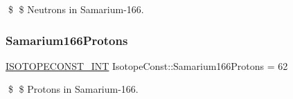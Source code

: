 \$ \$ Neutrons in Samarium-\/166. \mbox{\label{group___isotope_const-_samarium-_sm166_gab59256aba152d87b7b8c732ebb6dcf47}} 
\subsubsection{\texorpdfstring{Samarium166\+Protons}{Samarium166Protons}}
{\footnotesize\ttfamily \mbox{\hyperlink{group___isotope_const-_macros_ga5f18360b3e99483a35c32d789e62621c}{I\+S\+O\+T\+O\+P\+E\+C\+O\+N\+S\+T\+\_\+\+I\+NT}} Isotope\+Const\+::\+Samarium166\+Protons = 62}

\$ \$ Protons in Samarium-\/166. 